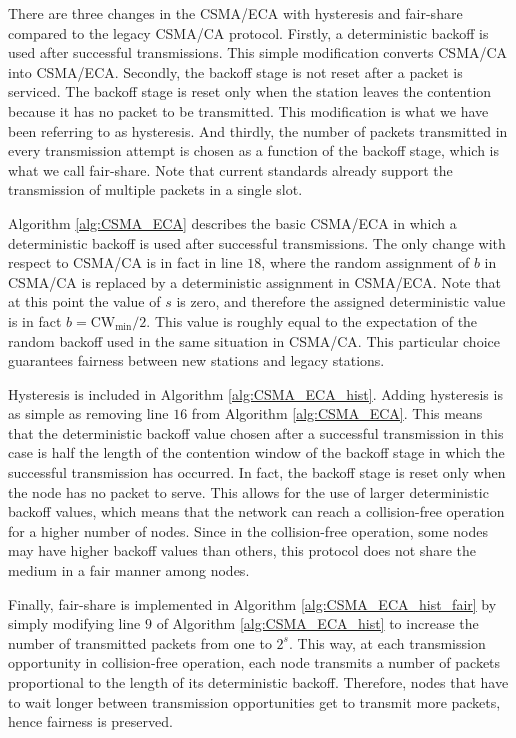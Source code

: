 \documentclass[conference]{IEEEtran}
\begin{document}
There are three changes in the CSMA/ECA with hysteresis and fair-share compared to the legacy CSMA/CA protocol. Firstly, a deterministic backoff is used after successful transmissions. This simple modification converts CSMA/CA into CSMA/ECA.
Secondly, the backoff stage is not reset after a packet is serviced.
The backoff stage is reset only when the station leaves the contention because it has no packet to be transmitted. This modification is what we have been referring to as hysteresis.
And thirdly, the number of packets transmitted in every transmission attempt is chosen as a function of the backoff stage, which is what we call fair-share.
Note that current standards already support the transmission of multiple packets in a single slot.

Algorithm \ref{alg:CSMA_ECA} describes the basic CSMA/ECA in which a deterministic backoff is used after successful transmissions. The only change with respect to CSMA/CA is in fact in line $18$, where the random assignment of $b$ in CSMA/CA is replaced by a deterministic assignment in CSMA/ECA. Note that at this point the value of $s$ is zero, and therefore the assigned deterministic value is in fact $b = \text{CW}_{\min}/2$.
This value is roughly equal to the expectation of the random backoff used in the same situation in CSMA/CA.
This particular choice guarantees fairness between new stations and legacy stations.

Hysteresis is included in Algorithm \ref{alg:CSMA_ECA_hist}. Adding hysteresis is as simple as removing line $16$ from Algorithm \ref{alg:CSMA_ECA}. This means that the deterministic backoff value chosen after a successful transmission in this case is half the length of the contention window of the backoff stage in which the successful transmission has occurred. In fact, the backoff stage is reset only when the node has no packet to serve. This allows for the use of larger deterministic backoff values, which means that the network can reach a collision-free operation for a higher number of nodes. Since in the collision-free operation, some nodes may have higher backoff values than others, this protocol does not share the medium in a fair manner among nodes.

Finally, fair-share is implemented in Algorithm \ref{alg:CSMA_ECA_hist_fair} by simply modifying
line $9$ of Algorithm \ref{alg:CSMA_ECA_hist} to increase the number of transmitted packets from one to $2^s$. This way, at each transmission opportunity in collision-free operation, each node transmits a number of packets proportional to the length of its deterministic backoff. Therefore, nodes that have to wait longer between transmission opportunities get to transmit more packets, hence fairness is preserved.
\end{document}
